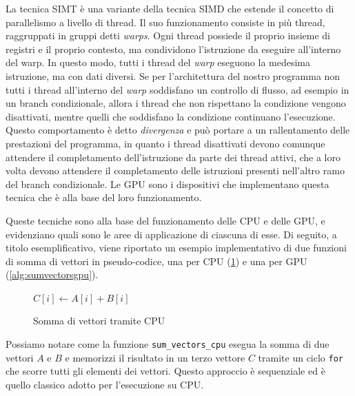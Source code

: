 La tecnica SIMT è una variante della tecnica SIMD che estende il concetto di parallelismo
a livello di thread. Il suo funzionamento consiste in più thread, raggruppati in
gruppi detti \textit{warps}. Ogni thread possiede il proprio insieme di registri
e il proprio contesto, ma condividono l'istruzione da eseguire all'interno del
warp. In questo modo, tutti i thread del \textit{warp} eseguono la medesima istruzione,
ma con dati diversi. Se per l'architettura del nostro programma non tutti i thread
all'interno del \textit{warp} soddisfano un controllo di flusso, ad esempio in un
branch condizionale, allora i thread che non rispettano la condizione vengono
disattivati, mentre quelli che soddisfano la condizione continuano l'esecuzione.
Questo comportamento è detto \textit{divergenza} e può portare a un rallentamento
delle prestazioni del programma, in quanto i thread disattivati devono comunque
attendere il completamento dell'istruzione da parte dei thread attivi, che a loro
volta devono attendere il completamento delle istruzioni presenti nell'altro ramo
del branch condizionale. Le GPU sono i dispositivi che implementano questa
tecnica che è alla base del loro funzionamento.

\vspace{1em}

Queste tecniche sono alla base del funzionamento delle CPU e delle GPU, e
evidenziano quali sono le aree di applicazione di ciascuna di esse. Di seguito,
a titolo esemplificativo, viene riportato un esempio implementativo di due funzioni
di somma di vettori in pseudo-codice, una per CPU (\ref{alg:sumvectorscpu}) e
una per GPU (\ref{alg:sumvectorsgpu}).

\begin{figure}[h!]
  \vspace{1em}
  \begin{algorithm}
    [H]
    \caption{Somma di vettori tramite CPU}
    \label{alg:sumvectorscpu}
    \begin{algorithmic}
        \State
      $C[i] \gets A[i] + B[i]$ \EndFor \EndFunction
    \end{algorithmic}
  \end{algorithm}
  \vspace{1em}
\end{figure}

Possiamo notare come la funzione \texttt{sum\_vectors\_cpu} esegua la somma di
due vettori $A$ e $B$ e memorizzi il risultato in un terzo vettore $C$ tramite
un ciclo \texttt{for} che scorre tutti gli elementi dei vettori. Questo
approccio è sequenziale ed è quello classico adotto per l'esecuzione su CPU.

